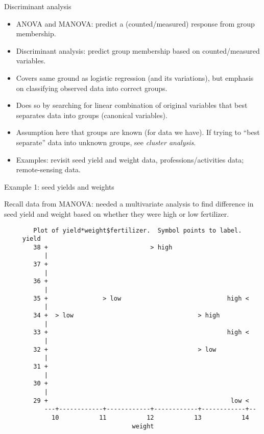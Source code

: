 \documentclass[pdf]{prosper}
\begin{document}
\begin{slide}{Discriminant analysis}

  \begin{itemize}
  \item ANOVA and MANOVA: predict a (counted/measured) response from group membership.
  \item Discriminant analysis: predict group membership based on counted/measured variables.
  \item Covers same ground as logistic regression (and its variations), but emphasis on classifying observed data into correct groups.
  \item Does so by searching for linear combination of original variables that best separates data into groups (canonical variables).
  \item Assumption here that groups are known (for data we have). If trying to ``best separate'' data into unknown groups, see {\em cluster analysis}.
  \item Examples: revisit seed yield and weight data,
    professions/activities data; remote-sensing data.
  \end{itemize}

\end{slide}

\begin{slide}{Example 1: seed yields and weights}

Recall data from MANOVA: needed a multivariate analysis to find difference in seed yield and weight based on whether they were high or low fertilizer.

{\tiny
\begin{verbatim}
        Plot of yield*weight$fertilizer.  Symbol points to label.
     yield
        38 +                            > high
           |
        37 +
           |
        36 +
           |
        35 +               > low                             high <
           |
        34 +  > low                                  > high
           |
        33 +                                                 high <
           |
        32 +                                         > low
           |
        31 +
           |
        30 +
           |
        29 +                                                  low <
           ---+------------+------------+------------+------------+--
             10           11           12           13           14
                                   weight
\end{verbatim}
}

  
\end{slide}
\end{document}
